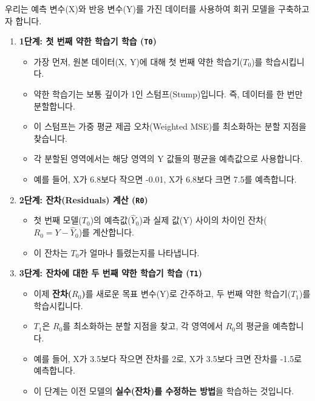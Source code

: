 \documentclass[11pt,a4paper]{article}
\theoremstyle{definition}
\begin{document}
\begin{tcolorbox}[example, title={회귀 문제 예시}] %
우리는 예측 변수(X)와 반응 변수(Y)를 가진 데이터를 사용하여 회귀 모델을 구축하고자 합니다.

\begin{enumerate}
    \item \textbf{1단계: 첫 번째 약한 학습기 학습 (\texttt{T0})}
    \begin{itemize}
        \item 가장 먼저, 원본 데이터(X, Y)에 대해 첫 번째 약한 학습기($T_0$)를 학습시킵니다.
        \item 약한 학습기는 보통 깊이가 1인 스텀프(Stump)입니다. 즉, 데이터를 한 번만 분할합니다.
        \item 이 스텀프는 가중 평균 제곱 오차(Weighted MSE)를 최소화하는 분할 지점을 찾습니다.
        \item 각 분할된 영역에서는 해당 영역의 Y 값들의 평균을 예측값으로 사용합니다.
        \item 예를 들어, X가 6.8보다 작으면 -0.01, X가 6.8보다 크면 7.5를 예측합니다.
    \end{itemize}

    \item \textbf{2단계: 잔차(Residuals) 계산 (\texttt{R0})}
    \begin{itemize}
        \item 첫 번째 모델($T_0$)의 예측값($\hat{Y}_0$)과 실제 값(Y) 사이의 차이인 잔차($R_0 = Y - \hat{Y}_0$)를 계산합니다.
        \item 이 잔차는 $T_0$가 얼마나 틀렸는지를 나타냅니다.
    \end{itemize}

    \item \textbf{3단계: 잔차에 대한 두 번째 약한 학습기 학습 (\texttt{T1})}
    \begin{itemize}
        \item 이제 \textbf{잔차($R_0$)}를 새로운 목표 변수(Y)로 간주하고, 두 번째 약한 학습기($T_1$)를 학습시킵니다.
        \item $T_1$은 $R_0$를 최소화하는 분할 지점을 찾고, 각 영역에서 $R_0$의 평균을 예측합니다.
        \item 예를 들어, X가 3.5보다 작으면 잔차를 2로, X가 3.5보다 크면 잔차를 -1.5로 예측합니다.
        \item 이 단계는 이전 모델의 \textbf{실수(잔차)를 수정하는 방법}을 학습하는 것입니다.
    \end{itemize}


\end{enumerate}
\end{tcolorbox}
\end{document}
